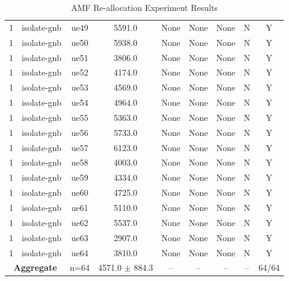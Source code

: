 \begin{table}[ht]
\begin{tabular}{|c|c|c|c|c|c|c|c|c|}
1 & isolate-gnb & ue49 & 5591.0 & None & None & None & N & Y \\
1 & isolate-gnb & ue50 & 5938.0 & None & None & None & N & Y \\
1 & isolate-gnb & ue51 & 3806.0 & None & None & None & N & Y \\
1 & isolate-gnb & ue52 & 4174.0 & None & None & None & N & Y \\
1 & isolate-gnb & ue53 & 4569.0 & None & None & None & N & Y \\
1 & isolate-gnb & ue54 & 4964.0 & None & None & None & N & Y \\
1 & isolate-gnb & ue55 & 5363.0 & None & None & None & N & Y \\
1 & isolate-gnb & ue56 & 5733.0 & None & None & None & N & Y \\
1 & isolate-gnb & ue57 & 6123.0 & None & None & None & N & Y \\
1 & isolate-gnb & ue58 & 4003.0 & None & None & None & N & Y \\
1 & isolate-gnb & ue59 & 4334.0 & None & None & None & N & Y \\
1 & isolate-gnb & ue60 & 4725.0 & None & None & None & N & Y \\
1 & isolate-gnb & ue61 & 5110.0 & None & None & None & N & Y \\
1 & isolate-gnb & ue62 & 5537.0 & None & None & None & N & Y \\
1 & isolate-gnb & ue63 & 2907.0 & None & None & None & N & Y \\
1 & isolate-gnb & ue64 & 3810.0 & None & None & None & N & Y \\
\multicolumn{2}{|c|}{\textbf{Aggregate}} & n=64 & 4571.0 $\pm$ 884.3 & -- & -- & -- & -- & 64/64 \\
\hline
\end{tabular}
\caption{AMF Re-allocation Experiment Results}
\label{tab:amf_realloc}
\end{table}

